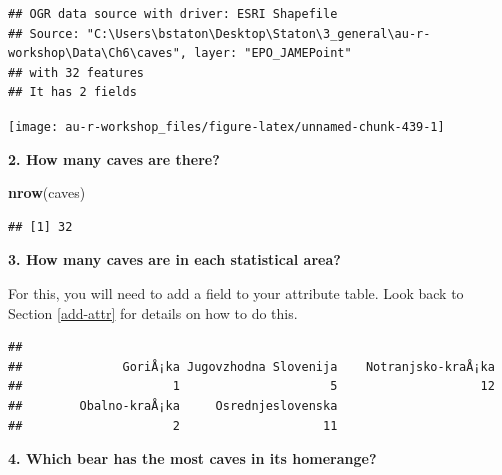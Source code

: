 \documentclass[]{book}
\newenvironment{Shaded}{\begin{snugshade}}{\end{snugshade}}
\newcommand{\DecValTok}[1]{\textcolor[rgb]{0.00,0.00,0.81}{#1}}
\newcommand{\KeywordTok}[1]{\textcolor[rgb]{0.13,0.29,0.53}{\textbf{#1}}}
\newcommand{\NormalTok}[1]{#1}
\newcommand{\OperatorTok}[1]{\textcolor[rgb]{0.81,0.36,0.00}{\textbf{#1}}}
\newcommand{\StringTok}[1]{\textcolor[rgb]{0.31,0.60,0.02}{#1}}
\begin{document}
\begin{verbatim}
## OGR data source with driver: ESRI Shapefile 
## Source: "C:\Users\bstaton\Desktop\Staton\3_general\au-r-workshop\Data\Ch6\caves", layer: "EPO_JAMEPoint"
## with 32 features
## It has 2 fields
\end{verbatim}

\begin{center}\texttt{[image: au-r-workshop\_files/figure-latex/unnamed-chunk-439-1]} \end{center}

\textbf{2. How many caves are there?}

\begin{Shaded}
\begin{Highlighting}[]
\KeywordTok{nrow}\NormalTok{(caves)}
\end{Highlighting}
\end{Shaded}

\begin{verbatim}
## [1] 32
\end{verbatim}

\textbf{3. How many caves are in each statistical area?}

For this, you will need to add a field to your attribute table. Look back to Section \ref{add-attr} for details on how to do this.

\begin{Shaded}
\end{Shaded}

\begin{verbatim}
## 
##              GoriÅ¡ka Jugovzhodna Slovenija    Notranjsko-kraÅ¡ka 
##                     1                     5                    12 
##        Obalno-kraÅ¡ka     Osrednjeslovenska 
##                     2                    11
\end{verbatim}

\textbf{4. Which bear has the most caves in its homerange?}
\end{document}
